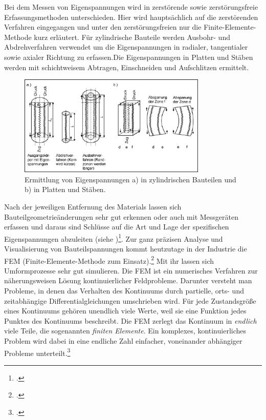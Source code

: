 \documentclass[12pt,a4paper,parskip]{scrartcl}
\begin{document}
{Bei dem Messen von Eigenspannungen wird in zerstörende sowie zerstörungsfreie Erfassungsmethoden unterschieden. Hier wird hauptsächlich auf die zerstörenden Verfahren eingegangen und unter den zerstörungsfreien nur die Finite-Elemente-Methode kurz erläutert. Für zylindrische Bauteile werden Ausbohr- und Abdrehverfahren verwendet um die Eigenspannungen in radialer, tangentialer sowie axialer Richtung zu erfassen.Die Eigenspannungen in Platten und Stäben werden mit schichtweisem Abtragen, Einschneiden und Aufschlitzen ermittelt.\begin{figure}
  \centering
  \includegraphics[width=0.8\textwidth]{eigenspanschnitt}
  \caption{Ermittlung von Eigenspannungen a) in zylindrischen Bauteilen und b) in Platten und Stäben.}
  \label{fig:eigenspanschnitt}
  \end{figure}
  Nach der jeweiligen Entfernung des Materials lassen sich Bauteilgeometrieänderungen sehr gut erkennen oder auch mit Messgeräten erfassen und daraus  sind Schlüsse auf die Art und Lage der spezifischen Eigenspannungen abzuleiten (siehe )\footcite[36]{hu}. Zur ganz präzisen Analyse  und Visualisierung von Bauteilspannungen kommt heutzutage in der Industrie  die FEM (Finite-Elemente-Methode zum Einsatz).\footcite[Vgl.][32-37]{hu} Mit ihr lassen sich Umformprozesse sehr gut simulieren. Die FEM ist ein numerisches Verfahren zur näherungsweisen Lösung kontinuierlicher Feldprobleme. Darunter versteht man Probleme, in denen das Verhalten des Kontinuums durch partielle, orts- und zeitabhängige Differentialgleichungen umschrieben wird. Für jede Zustandsgröße eines Kontinuums gehören unendlich viele Werte, weil sie eine Funktion jedes Punktes des Kontinuums beschreibt. Die FEM zerlegt das Kontinuum in \emph{endlich} viele Teile, die sogenannten \emph{finiten Elemente}. Ein komplexes, kontinuierliches Problem wird dabei in eine endliche Zahl einfacher, voneinander abhängiger Probleme unterteilt.\footcite[Vgl.][48]{fu}
}
\end{document}

